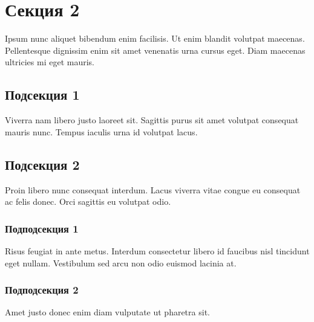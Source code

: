 \section{Секция 2}

Ipsum nunc aliquet bibendum enim facilisis. Ut enim blandit volutpat maecenas. Pellentesque 
dignissim enim sit amet venenatis urna cursus eget. Diam maecenas ultricies mi eget mauris. 

\subsection{Подсекция 1}

Viverra nam libero justo laoreet sit. Sagittis purus sit amet volutpat consequat mauris nunc. 
Tempus iaculis urna id volutpat lacus. 

\subsection{Подсекция 2}

Proin libero nunc consequat interdum. Lacus viverra vitae congue eu consequat ac felis donec. 
Orci sagittis eu volutpat odio. 

\subsubsection{Подподсекция 1}

Risus feugiat in ante metus. Interdum consectetur libero id faucibus nisl tincidunt eget nullam. 
Vestibulum sed arcu non odio euismod lacinia at. 

\subsubsection{Подподсекция 2}

Amet justo donec enim diam vulputate ut pharetra sit.

\clearpage